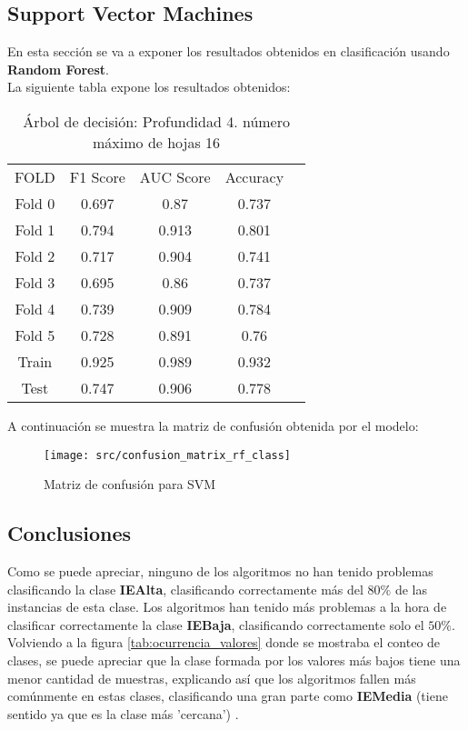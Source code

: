 \subsection{Support Vector Machines}
En esta sección se va a exponer los resultados obtenidos en clasificación usando  \textbf{Random Forest}.\\
La siguiente tabla expone los resultados obtenidos:
\begin{table}[H]
	\centering
	\begin{tabular}{|c|c|c|c|c}
		\cline{1-4}
		FOLD & F1 Score & AUC Score & Accuracy \\\cline{1-4}
		Fold 0 & 0.697 & 0.87 & 0.737\\ \cline{1-4}
		Fold 1 & 0.794 & 0.913 & 0.801\\ \cline{1-4}
		Fold 2 & 0.717 & 0.904 & 0.741\\ \cline{1-4}
		Fold 3 & 0.695 & 0.86 & 0.737\\ \cline{1-4}
		Fold 4 & 0.739 & 0.909 & 0.784\\ \cline{1-4}
		Fold 5 & 0.728 & 0.891 & 0.76\\ \cline{1-4}
		Train & 0.925 & 0.989 & 0.932\\\cline{1-4}
		Test & 0.747 & 0.906 & 0.778\\\cline{1-4}
	\end{tabular}
	\caption{Árbol de decisión:  Profundidad 4. número máximo de hojas 16}
	\label{tab:svm_class_res}
\end{table}
A continuación se muestra la matriz de confusión obtenida por el modelo:
\begin{figure}[H]
	\centering
	\texttt{[image: src/confusion\_matrix\_rf\_class]}
	\caption{Matriz de confusión para SVM}
	\label{fig:confusion_matrix_svm}
\end{figure}
\subsection{Conclusiones}
Como se puede apreciar, ninguno de los algoritmos no han tenido problemas clasificando la clase \textbf{IEAlta}, clasificando correctamente más del $80\%$ de las instancias de esta clase.
Los algoritmos han tenido más problemas a la hora de clasificar correctamente la clase \textbf{IEBaja}, clasificando correctamente solo el $50\%$. Volviendo a la figura \ref{tab:ocurrencia_valores} donde se mostraba el conteo de clases, se puede apreciar que la clase formada por los valores más bajos tiene una menor cantidad de muestras, explicando así que los algoritmos fallen más comúnmente en estas clases, clasificando una gran parte como \textbf{IEMedia} (tiene sentido ya que es la clase más 'cercana') .